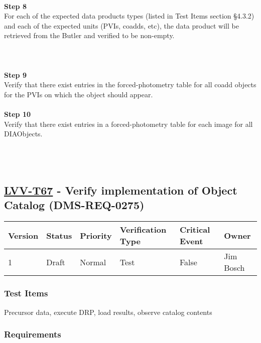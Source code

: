 ~\\
\textbf{Step 8}\\
For each of the expected data products types (listed in Test Items
section §4.3.2) and each of the expected units (PVIs, coadds, etc), the
data product will be retrieved from the Butler and verified to be
non-empty.\\
~\\
~\\
~\\
\textbf{Step 9}\\
Verify that there exist entries in the forced-photometry table for all
coadd objects for the PVIs on which the object should appear.\\
~\\
\textbf{Step 10}\\
Verify that there exist entries in a forced-photometry table for each
image for all DIAObjects.\\
~\\
~\\
~\\

\hypertarget{lvv-t67---verify-implementation-of-object-catalog-dms-req-0275}{%
\subsection{\texorpdfstring{\href{https://jira.lsstcorp.org/secure/Tests.jspa\#/testCase/LVV-T67}{LVV-T67}
- Verify implementation of Object Catalog
(DMS-REQ-0275)}{LVV-T67 - Verify implementation of Object Catalog (DMS-REQ-0275)}}\label{lvv-t67---verify-implementation-of-object-catalog-dms-req-0275}}

\begin{longtable}[]{@{}llllll@{}}
\toprule
Version & Status & Priority & Verification Type & Critical Event &
Owner\tabularnewline
\midrule
\endhead
1 & Draft & Normal & Test & False & Jim Bosch\tabularnewline
\bottomrule
\end{longtable}

\hypertarget{test-items-43}{%
\subsubsection{Test Items}\label{test-items-43}}

Precursor data, execute DRP, load results, observe catalog contents

\hypertarget{requirements-44}{%
\subsubsection{Requirements}\label{requirements-44}}

